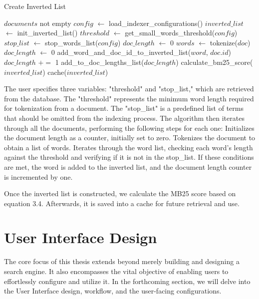 \begin{algorithm}[H]
	\caption{Create Inverted List}\label{alg:alg1}
	\begin{algorithmic}[1]
	    \Require $documents$ not empty
		\State $config$ $\gets$ load\_indexer\_configurations()
		\State $inverted\_list$ $\gets$ init\_inverted\_list()
		\State $threshold$ $\gets$ get\_small\_words\_threshold($config$)
	    \State $stop\_list$ $\gets$ stop\_words\_list($config$)
          \State $doc\_length$ $\gets$ 0
          \State $words$ $\gets$ tokenize($doc$)
          	\State $doc\_length$ $\gets$ 0
		    	\State add\_word\_and\_doc\_id\_to\_inverted\_list($word$, $doc.id$)
		    	\State $doc\_length$ $\mathrel{+}=$ 1
			\EndIf
          \EndFor
          \State add\_to\_doc\_lengths\_list($doc\_length$)
        \EndFor
        \State calculate\_bm25\_score($inverted\_list$)
        \State cache($inverted\_list$)

	\end{algorithmic}
\end{algorithm}

The user specifies three variables: "threshold" and "stop\_list," which are retrieved from the database. The "threshold" represents the minimum word length required for tokenization from a document. The "stop\_list" is a predefined list of terms that should be omitted from the indexing process.
The algorithm then iterates through all the documents, performing the following steps for each one:
Initializes the document length as a counter, initially set to zero.
Tokenizes the document to obtain a list of words.
Iterates through the word list, checking each word's length against the threshold and verifying if it is not in the stop\_list. If these conditions are met, the word is added to the inverted list, and the document length counter is incremented by one.


Once the inverted list is constructed, we calculate the MB25 score based on equation 3.4. Afterwards, it is saved into a cache for future retrieval and use.

\section{User Interface Design}
The core focus of this thesis extends beyond merely building and designing a search engine. It also encompasses the vital objective of enabling users to effortlessly configure and utilize it. In the forthcoming section, we will delve into the User Interface design, workflow, and the user-facing configurations.

